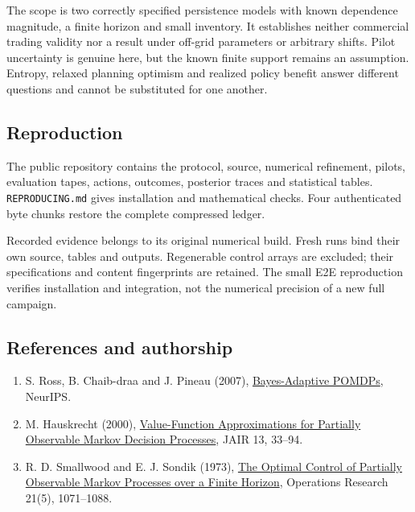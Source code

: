 \documentclass[10pt,a4paper]{article}
\begin{document}


The scope is two correctly specified persistence models with known dependence
magnitude, a finite horizon and small inventory. It establishes neither commercial
trading validity nor a result under off-grid parameters or arbitrary shifts.
Pilot uncertainty is genuine here, but the known finite support remains an
assumption. Entropy, relaxed planning optimism and realized policy benefit answer
different questions and cannot be substituted for one another.

\subsection*{Reproduction}
The public repository contains the protocol, source, numerical refinement,
pilots, evaluation tapes, actions, outcomes, posterior traces and statistical
tables. \texttt{REPRODUCING.md} gives installation and mathematical checks.
Four authenticated byte chunks restore the complete compressed ledger.

Recorded evidence belongs to its original numerical build. Fresh runs bind
their own source, tables and outputs. Regenerable control arrays are excluded;
their specifications and content fingerprints are retained. The small E2E
reproduction verifies installation and integration, not the numerical precision
of a new full campaign.

\subsection*{References and authorship}
\begin{enumerate}\small
\item S. Ross, B. Chaib-draa and J. Pineau (2007),
\href{https://papers.nips.cc/paper_files/paper/2007/file/3b3dbaf68507998acd6a5a5254ab2d76-Paper.pdf}{Bayes-Adaptive POMDPs}, NeurIPS.
\item M. Hauskrecht (2000),
\href{https://jair.org/index.php/jair/article/download/10262/24449}{Value-Function Approximations for Partially Observable Markov Decision Processes}, JAIR 13, 33--94.
\item R. D. Smallwood and E. J. Sondik (1973),
\href{https://pubsonline.informs.org/doi/10.1287/opre.21.5.1071}{The Optimal Control of Partially Observable Markov Processes over a Finite Horizon}, Operations Research 21(5), 1071--1088.
\end{enumerate}
\end{document}
